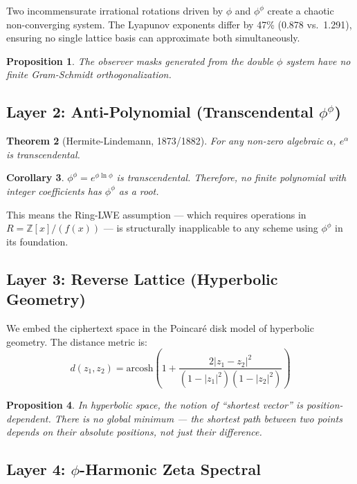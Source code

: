 \documentclass[11pt,a4paper]{article}
\newtheorem{theorem}{Theorem}[section]
\newtheorem{corollary}[theorem]{Corollary}
\newtheorem{proposition}[theorem]{Proposition}
\theoremstyle{remark}
\begin{document}
Two incommensurate irrational rotations driven by $\phi$ and $\phi^\phi$ create a chaotic non-converging system. The Lyapunov exponents differ by 47\% (0.878 vs.\ 1.291), ensuring no single lattice basis can approximate both simultaneously.

\begin{proposition}
The observer masks generated from the double $\phi$ system have no finite Gram-Schmidt orthogonalization.
\end{proposition}

\subsection{Layer 2: Anti-Polynomial (Transcendental $\phi^\phi$)}

\begin{theorem}[Hermite-Lindemann, 1873/1882]
For any non-zero algebraic $\alpha$, $e^\alpha$ is transcendental.
\end{theorem}

\begin{corollary}
$\phi^\phi = e^{\phi \ln \phi}$ is transcendental. Therefore, no finite polynomial with integer coefficients has $\phi^\phi$ as a root.
\end{corollary}

This means the Ring-LWE assumption — which requires operations in $R = \mathbb{Z}[x]/(f(x))$ — is structurally inapplicable to any scheme using $\phi^\phi$ in its foundation.

\subsection{Layer 3: Reverse Lattice (Hyperbolic Geometry)}

We embed the ciphertext space in the Poincar\'{e} disk model of hyperbolic geometry. The distance metric is:
\begin{equation}
    d(z_1, z_2) = \text{arcosh}\left(1 + \frac{2|z_1 - z_2|^2}{(1-|z_1|^2)(1-|z_2|^2)}\right)
\end{equation}

\begin{proposition}
In hyperbolic space, the notion of ``shortest vector'' is position-dependent. There is no global minimum — the shortest path between two points depends on their absolute positions, not just their difference.
\end{proposition}

\subsection{Layer 4: $\phi$-Harmonic Zeta Spectral}
\end{document}
